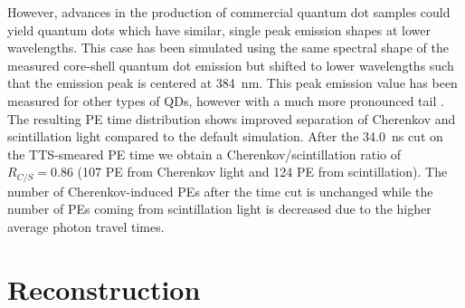 \documentclass[aps,prc,twocolumn,groupedaddress,showpacs,amsmath,amssymb,floatfix,superscriptaddress]{revtex4}
\begin{document}
However, advances in the production of commercial quantum dot samples
could yield quantum dots which have similar, single peak emission
shapes at lower wavelengths. This case has been simulated using the
same spectral shape of the measured core-shell quantum dot emission
but shifted to lower wavelengths such that the emission peak is
centered at 384~nm. This peak emission value has been measured for
other types of QDs, however with a much more pronounced tail
\cite{qdot2}. The resulting PE time distribution shows improved
separation of Cherenkov and scintillation light compared to the
default simulation. After the 34.0~ns cut on the TTS-smeared PE time
we obtain a Cherenkov/scintillation ratio of $R_{C/S}=0.86$ (107 PE
from Cherenkov light and 124 PE from scintillation). The number of
Cherenkov-induced PEs after the time cut is unchanged while the number
of PEs coming from scintillation light is decreased due to the higher
average photon travel times.

\section{Reconstruction}
\label{reconstruction_sec}
\end{document}
